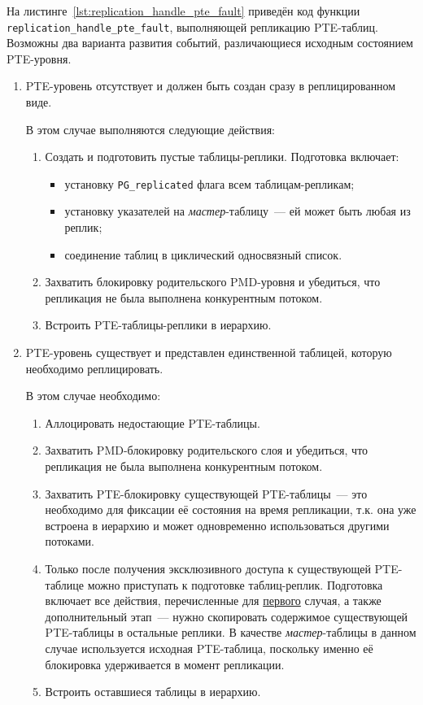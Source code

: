 На листинге~\ref{lst:replication_handle_pte_fault} приведён код функции \texttt{replication\_handle\_pte\_fault}, выполняющей репликацию PTE-таблиц. Возможны два варианта развития событий, различающиеся исходным состоянием PTE-уровня.
\begin{enumerate}
	\item\hypertarget{itm:table_repl_absent}{} PTE-уровень отсутствует и должен быть создан сразу в реплицированном виде.

	В этом случае выполняются следующие действия:
	\begin{enumerate}
		\item Создать и подготовить пустые таблицы-реплики. Подготовка включает:
		\begin{itemize}
			\item установку \texttt{PG\_replicated} флага всем таблицам-репликам;
			\item установку указателей на \textit{мастер}-таблицу~--- ей может быть любая из реплик;
			\item соединение таблиц в циклический односвязный список.
		\end{itemize}
		\item Захватить блокировку родительского PMD-уровня и убедиться, что репликация не была выполнена конкурентным потоком.
		\item Встроить PTE-таблицы-реплики в иерархию.
	\end{enumerate}

	\item PTE-уровень существует и представлен единственной таблицей, которую необходимо реплицировать.

	В этом случае необходимо:
	\begin{enumerate}
		\item Аллоцировать недостающие PTE-таблицы.
		\item Захватить PMD-блокировку родительского слоя и убедиться, что репликация не была выполнена конкурентным потоком.
		\item Захватить PTE-блокировку существующей PTE-таблицы~--- это необходимо для фиксации её состояния на время репликации, т.к. она уже встроена в иерархию и может одновременно использоваться другими потоками.
		\item Только после получения эксклюзивного доступа к существующей PTE-таблице можно приступать к подготовке таблиц-реплик. Подготовка включает все действия, перечисленные для \hyperlink{itm:table_repl_absent}{первого} случая, а также дополнительный этап~--- нужно скопировать содержимое существующей PTE-таблицы в остальные реплики. В качестве \textit{мастер}-таблицы в данном случае используется исходная PTE-таблица, поскольку именно её блокировка удерживается в момент репликации.
		\item Встроить оставшиеся таблицы в иерархию.
	\end{enumerate}
\end{enumerate}

